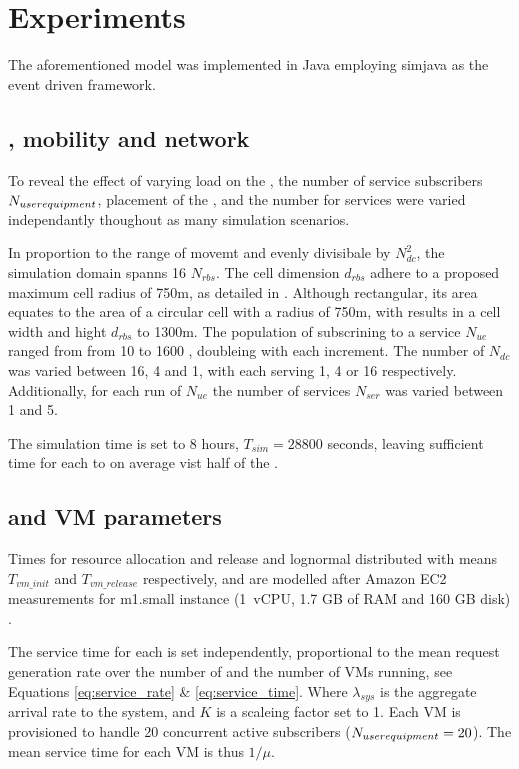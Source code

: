\section{Experiments}
\label{sec:experiments}
The aforementioned model was implemented in Java employing simjava \cite{SimJava} as the event driven framework.

\subsection{\Ue, mobility and network}
To reveal the effect of varying load on the \dcs, the number of \ue service subscribers $N_{user equipment}$, placement of the \dcs{}, and the number for services were varied independantly thoughout as many simulation scenarios. 

In proportion to the range of movemt and evenly divisibale by $N_{dc}^2$, the simulation domain spanns 16 \rbss{} $N_{rbs}$. The cell dimension $d_{rbs}$ adhere to a proposed maximum cell radius of 750m, as detailed in \cite{shahab2013framework}. Although rectangular, its area equates to the area of a circular cell with a radius of 750m, with results in a cell width and hight $d_{rbs}$ to 1300m. The population of \ues{} subscrining to a service $N_{ue}$ ranged from from 10 to 1600 \ues{}, doubleing with each increment. The number of \dcs{} $N_{dc}$ was varied between 16, 4 and 1, with each \dc{} serving 1, 4 or 16 \rbss{} respectively. Additionally, for each run of $N_{ue}$ the number of services $N_{ser}$ was varied between 1 and 5.

The simulation time is set to 8 hours, $T_{sim}=28800$ seconds, leaving sufficient time for each \ue to on average vist half of the \rbss.

\subsection{\Dc and VM parameters}
Times for resource allocation and release and lognormal distributed with means $T_{vm\_init}$ and $T_{vm\_release}$ respectively, and are modelled after Amazon EC2 measurements for m1.small instance (1~vCPU, 1.7 GB of RAM and 160 GB disk) \cite{5719609}. %

The service time for each \dc{} is set independently, proportional to the mean request generation rate over the number of \rbss{} and the number of VMs running, see Equations \ref{eq:service_rate} \& \ref{eq:service_time}. Where $\lambda_{sys}$ is the aggregate arrival rate to the system, and $K$ is a scaleing factor set to 1. Each VM is provisioned to handle 20 concurrent active subscribers ($N_{user equipment} = 20$). The mean service time for each VM is thus $1/\mu$.

